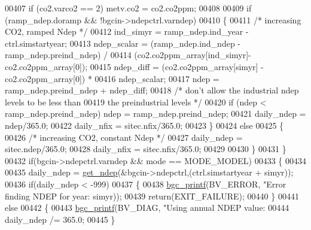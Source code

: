 \begin{DoxyCode}
{{{{00407                 \textcolor{keywordflow}{if} (co2.varco2 == 2) metv.co2 = co2.co2ppm;
00408                 
00409                 \textcolor{keywordflow}{if} (ramp\_ndep.doramp && !bgcin->ndepctrl.varndep)
00410                 \{
00411                     \textcolor{comment}{/* increasing CO2, ramped Ndep */}
00412                     ind\_simyr = ramp\_ndep.ind\_year - ctrl.simstartyear;
00413                     ndep\_scalar = (ramp\_ndep.ind\_ndep - ramp\_ndep.preind\_ndep) / 
00414                         (co2.co2ppm\_array[ind\_simyr]-co2.co2ppm\_array[0]);
00415                     ndep\_diff = (co2.co2ppm\_array[simyr] - co2.co2ppm\_array[0]) * 
00416                         ndep\_scalar;
00417                     ndep = ramp\_ndep.preind\_ndep + ndep\_diff;
00418                     \textcolor{comment}{/* don't allow the industrial ndep levels to be less than}
00419 \textcolor{comment}{                    the preindustrial levels */}
00420                     \textcolor{keywordflow}{if} (ndep < ramp\_ndep.preind\_ndep) ndep = ramp\_ndep.preind\_ndep;
00421                     daily\_ndep = ndep/365.0;
00422                     daily\_nfix = sitec.nfix/365.0;
00423                 \}
00424                 \textcolor{keywordflow}{else}
00425                 \{
00426                     \textcolor{comment}{/* increasing CO2, constant Ndep */}
00427                     daily\_ndep = sitec.ndep/365.0;
00428                     daily\_nfix = sitec.nfix/365.0;
00429                     
00430                 \}
00431             \}
00432             \textcolor{keywordflow}{if}(bgcin->ndepctrl.varndep && mode == MODE\_MODEL)
00433             \{
00434 
00435                 daily\_ndep = \hyperlink{get__ndep_8c_aca9b864bbce6d9c79e047c688ecdaf86}{get\_ndep}(&bgcin->ndepctrl,(ctrl.simstartyear + simyr));
00436                 \textcolor{keywordflow}{if}(daily\_ndep < -999)
00437                 \{
00438                     \hyperlink{bgc__io_8c_af287cce6e2aede1ce337de9319e80d0d}{bgc\_printf}(BV\_ERROR, \textcolor{stringliteral}{"Error finding NDEP for year: %
      simyr));
00439                     \textcolor{keywordflow}{return}(EXIT\_FAILURE);
00440                 \}
00441                 \textcolor{keywordflow}{else}
00442                 \{
00443                     \hyperlink{bgc__io_8c_af287cce6e2aede1ce337de9319e80d0d}{bgc\_printf}(BV\_DIAG, \textcolor{stringliteral}{"Using annual NDEP value: %
00444                     daily\_ndep /= 365.0;    
00445                 \}
}}}}}}
\end{DoxyCode}
